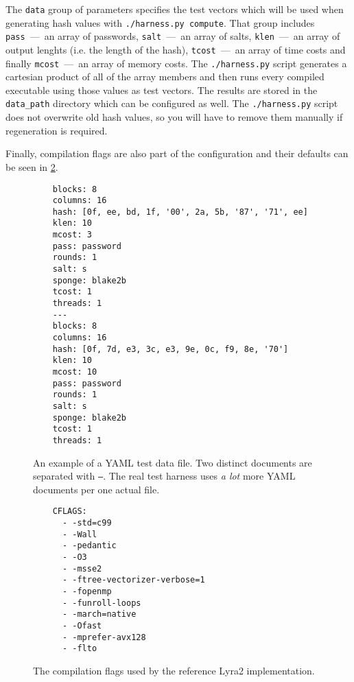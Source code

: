The \texttt{data} group of parameters specifies the test vectors which will be used when generating hash values with \texttt{./harness.py compute}. That group includes \texttt{pass}~---~an array of passwords, \texttt{salt}~---~an array of salts, \texttt{klen}~---~an array of output lenghts (i.e. the length of the hash), \texttt{tcost}~---~an array of time costs and finally \texttt{mcost}~---~an array of memory costs. The \texttt{./harness.py} script generates a cartesian product of all of the array members and then runs every compiled executable using those values as test vectors. The results are stored in the \texttt{data_path} directory which can be configured as well. The \texttt{./harness.py} script does not overwrite old hash values, so you will have to remove them manually if regeneration is required.

Finally, compilation flags are also part of the configuration and their defaults can be seen in \ref{fig:compile-flags}.

\begin{figure}
    \begin{verbatim}
    blocks: 8
    columns: 16
    hash: [0f, ee, bd, 1f, '00', 2a, 5b, '87', '71', ee]
    klen: 10
    mcost: 3
    pass: password
    rounds: 1
    salt: s
    sponge: blake2b
    tcost: 1
    threads: 1
    ---
    blocks: 8
    columns: 16
    hash: [0f, 7d, e3, 3c, e3, 9e, 0c, f9, 8e, '70']
    klen: 10
    mcost: 10
    pass: password
    rounds: 1
    salt: s
    sponge: blake2b
    tcost: 1
    threads: 1
    \end{verbatim}
    \caption{An example of a YAML test data file. Two distinct documents are separated with \texttt{---}. The real test harness uses \emph{a lot} more YAML documents per one actual file.}
    \label{fig:yaml-data}
  \end{figure}


\begin{figure}
    \begin{verbatim}
    CFLAGS:
      - -std=c99
      - -Wall
      - -pedantic
      - -O3
      - -msse2
      - -ftree-vectorizer-verbose=1
      - -fopenmp
      - -funroll-loops
      - -march=native
      - -Ofast
      - -mprefer-avx128
      - -flto
      \end{verbatim}
      \caption{The compilation flags used by the reference Lyra2 implementation.}
      \label{fig:compile-flags}
  \end{figure}
